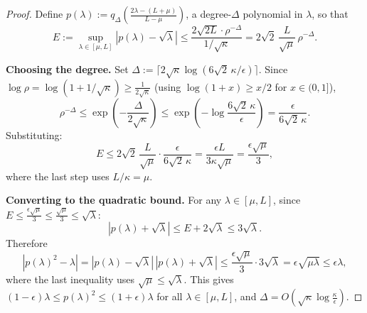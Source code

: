 \begin{proof}
Define $p(\lambda) := q_\Delta\!\left(\frac{2\lambda - (L+\mu)}{L-\mu}\right)$, a degree-$\Delta$ polynomial in $\lambda$, so that
\[
    E := \sup_{\lambda \in [\mu,L]} |p(\lambda) - \sqrt{\lambda}| \leq \frac{2\sqrt{2L} \cdot \rho^{-\Delta}}{1/\sqrt{\kappa}} = 2\sqrt{2}\,\frac{L}{\sqrt{\mu}}\,\rho^{-\Delta}.
\]

\textbf{Choosing the degree.}
Set $\Delta := \lceil 2\sqrt{\kappa}\log(6\sqrt{2}\,\kappa/\epsilon)\rceil$. Since $\log\rho = \log(1 + 1/\sqrt{\kappa}) \geq \frac{1}{2\sqrt{\kappa}}$ (using $\log(1+x) \geq x/2$ for $x \in (0,1]$),
\[
    \rho^{-\Delta} \leq \exp\!\left(-\frac{\Delta}{2\sqrt{\kappa}}\right) \leq \exp\!\left(-\log\frac{6\sqrt{2}\,\kappa}{\epsilon}\right) = \frac{\epsilon}{6\sqrt{2}\,\kappa}.
\]
Substituting:
\[
    E \leq 2\sqrt{2}\,\frac{L}{\sqrt{\mu}} \cdot \frac{\epsilon}{6\sqrt{2}\,\kappa} = \frac{\epsilon L}{3\kappa\sqrt{\mu}} = \frac{\epsilon\sqrt{\mu}}{3},
\]
where the last step uses $L/\kappa = \mu$.

\textbf{Converting to the quadratic bound.}
For any $\lambda \in [\mu, L]$, since $E \leq \frac{\epsilon\sqrt{\mu}}{3} \leq \frac{\sqrt{\mu}}{3} \leq \sqrt{\lambda}$:
\[
    |p(\lambda) + \sqrt{\lambda}| \leq E + 2\sqrt{\lambda} \leq 3\sqrt{\lambda}.
\]
Therefore
\[
    |p(\lambda)^2 - \lambda| = |p(\lambda) - \sqrt{\lambda}|\,|p(\lambda) + \sqrt{\lambda}| \leq \frac{\epsilon\sqrt{\mu}}{3} \cdot 3\sqrt{\lambda} = \epsilon\sqrt{\mu\lambda} \leq \epsilon\lambda,
\]
where the last inequality uses $\sqrt{\mu} \leq \sqrt{\lambda}$. This gives $(1-\epsilon)\lambda \leq p(\lambda)^2 \leq (1+\epsilon)\lambda$ for all $\lambda \in [\mu, L]$, and $\Delta = O(\sqrt{\kappa}\log\frac{\kappa}{\epsilon})$.
\end{proof}
